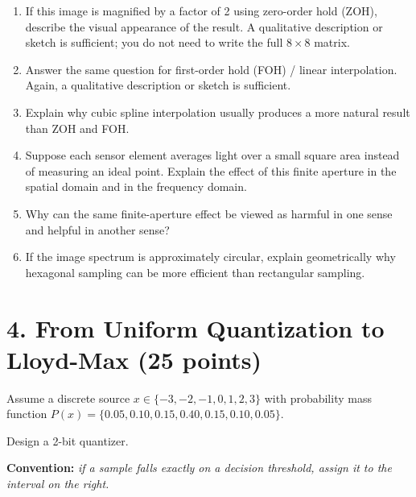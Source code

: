 \begin{enumerate}
    \item[\textbf{(a)}] If this image is magnified by a factor of 2 using zero-order hold (ZOH), describe the visual appearance of the result. A qualitative description or sketch is sufficient; you do not need to write the full $8\times 8$ matrix.
    \item[\textbf{(b)}] Answer the same question for first-order hold (FOH) / linear interpolation. Again, a qualitative description or sketch is sufficient.
    \item[\textbf{(c)}] Explain why cubic spline interpolation usually produces a more natural result than ZOH and FOH.
    \item[\textbf{(d)}] Suppose each sensor element averages light over a small square area instead of measuring an ideal point. Explain the effect of this finite aperture in the spatial domain and in the frequency domain.
    \item[\textbf{(e)}] Why can the same finite-aperture effect be viewed as harmful in one sense and helpful in another sense?
    \item[\textbf{(f)}] If the image spectrum is approximately circular, explain geometrically why hexagonal sampling can be more efficient than rectangular sampling.
\end{enumerate}

\section*{4. From Uniform Quantization to Lloyd-Max (25 points)}

Assume a discrete source $x \in \{-3, -2, -1, 0, 1, 2, 3\}$ with probability mass function $P(x) = \{0.05, 0.10, 0.15, 0.40, 0.15, 0.10, 0.05\}$.

Design a 2-bit quantizer.

\textbf{Convention:} \textit{if a sample falls exactly on a decision threshold, assign it to the interval on the right.}

